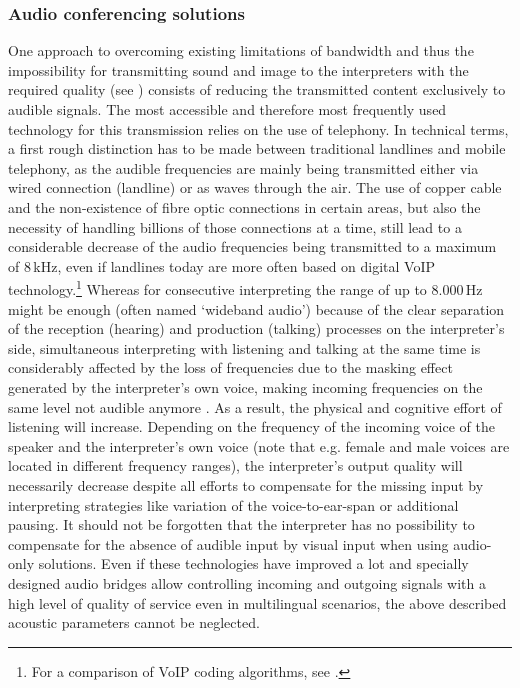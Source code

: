 \documentclass[output=paper]{langsci/langscibook}
\begin{document}
\subsubsection{Audio conferencing solutions}
\label{sub:ziegler:4.3}
One approach to overcoming existing limitations of bandwidth and thus the impossibility for transmitting sound and image to the interpreters with the required quality (see ) consists of reducing the transmitted content exclusively to audible signals. The most accessible and therefore most frequently used technology for this transmission relies on the use of telephony. In technical terms, a first rough distinction has to be made between traditional landlines and mobile telephony, as the audible frequencies are mainly being transmitted either via wired connection (landline) or as waves through the air. The use of copper cable and the non-existence of fibre optic connections in certain areas, but also the necessity of handling billions of those connections at a time, still lead to a considerable decrease of the audio frequencies being transmitted to a maximum of 8\,kHz, even if landlines today are more often based on digital VoIP technology.\footnote{For a comparison of VoIP coding algorithms, see \citet{Singh2016}.} Whereas for consecutive interpreting the range of up to 8.000\,Hz might be enough (often named ‘wideband audio’) because of the clear separation of the reception (hearing) and production (talking) processes on the interpreter’s side, simultaneous interpreting with listening and talking at the same time is considerably affected by the loss of frequencies due to the masking effect generated by the interpreter’s own voice, making incoming frequencies on the same level not audible anymore \citep{Jumpelt1984}. As a result, the physical and cognitive effort of listening will increase. Depending on the frequency of the incoming voice of the speaker and the interpreter’s own voice (note that e.g. female and male voices are located in different frequency ranges), the interpreter’s output quality will necessarily decrease despite all efforts to compensate for the missing input by interpreting strategies like variation of the voice-to-ear-span or additional pausing. It should not be forgotten that the interpreter has no possibility to compensate for the absence of audible input by visual input when using audio-only solutions. Even if these technologies have improved a lot and specially designed audio bridges allow controlling incoming and outgoing signals with a high level of quality of service even in multilingual scenarios, the above described acoustic parameters cannot be neglected.
\end{document}
